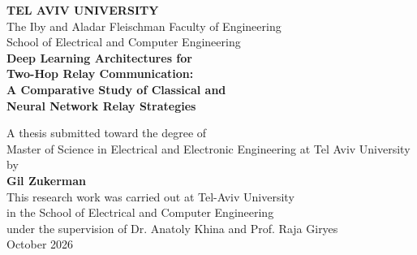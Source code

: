 \documentclass[12pt,a4paper,oneside]{book}
\theoremstyle{definition}
\begin{document}
\begin{titlepage}
\begin{center}
\vspace*{0.5cm}

{\LARGE\textbf{TEL AVIV UNIVERSITY}}\\[6pt]
{\large The Iby and Aladar Fleischman Faculty of Engineering}\\[4pt]
{\large School of Electrical and Computer Engineering}\\[2cm]

{\LARGE\bfseries
Deep Learning Architectures for\\[6pt]
Two-Hop Relay Communication:\\[6pt]
A Comparative Study of Classical and\\[6pt]
Neural Network Relay Strategies\\[2cm]
}

{\large A thesis submitted toward the degree of}\\[4pt]
{\large Master of Science in Electrical and Electronic Engineering \newline at Tel Aviv University}\\[1.5cm]

{\large by}\\[6pt]
{\Large\bfseries Gil Zukerman}\\[1.5cm]
This research work was carried out at Tel-Aviv University\\
in the School of Electrical and Computer Engineering\\
under the supervision of Dr. Anatoly Khina and Prof. Raja Giryes\\
\vfill
{\large{October 2026}}\\[1.5cm]
\vfill
\end{center}
\end{titlepage}

\frontmatter
{}
\hypersetup{pageanchor=true}



\end{document}
